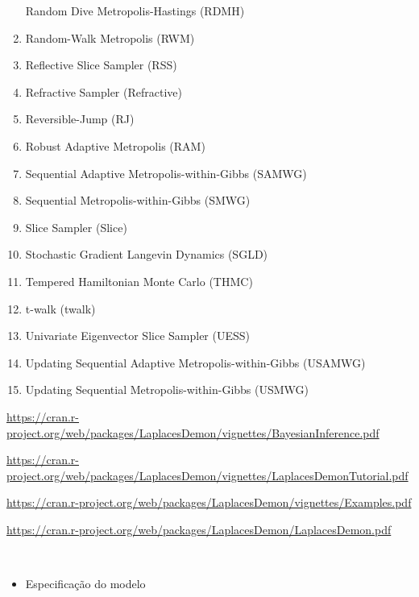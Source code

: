 \documentclass[
]{book}
\providecommand{\tightlist}{%
  \setlength{\itemsep}{0pt}\setlength{\parskip}{0pt}}
\begin{document}
\begin{enumerate}
  Random Dive Metropolis-Hastings (RDMH)
\item
  Random-Walk Metropolis (RWM)
\item
  Reflective Slice Sampler (RSS)
\item
  Refractive Sampler (Refractive)
\item
  Reversible-Jump (RJ)
\item
  Robust Adaptive Metropolis (RAM)
\item
  Sequential Adaptive Metropolis-within-Gibbs (SAMWG)
\item
  Sequential Metropolis-within-Gibbs (SMWG)
\item
  Slice Sampler (Slice)
\item
  Stochastic Gradient Langevin Dynamics (SGLD)
\item
  Tempered Hamiltonian Monte Carlo (THMC)
\item
  t-walk (twalk)
\item
  Univariate Eigenvector Slice Sampler (UESS)
\item
  Updating Sequential Adaptive Metropolis-within-Gibbs (USAMWG)
\item
  Updating Sequential Metropolis-within-Gibbs (USMWG)
\end{enumerate}

\url{https://cran.r-project.org/web/packages/LaplacesDemon/vignettes/BayesianInference.pdf}

\url{https://cran.r-project.org/web/packages/LaplacesDemon/vignettes/LaplacesDemonTutorial.pdf}

\url{https://cran.r-project.org/web/packages/LaplacesDemon/vignettes/Examples.pdf}

\url{https://cran.r-project.org/web/packages/LaplacesDemon/LaplacesDemon.pdf}

\(~\)

\begin{itemize}
\tightlist
\item
  Especificação do modelo
\end{itemize}
\end{document}
